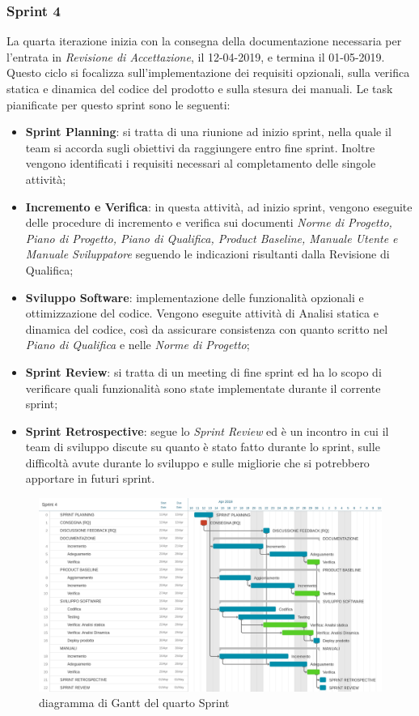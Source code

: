 \subsubsection{Sprint 4}
La quarta iterazione inizia con la consegna della documentazione necessaria per l'entrata in \emph{Revisione di Accettazione}, il 12-04-2019, e termina il 01-05-2019. Questo ciclo si focalizza sull'implementazione dei requisiti opzionali, sulla verifica statica e dinamica del codice del prodotto e sulla stesura dei manuali.
Le task pianificate per questo sprint sono le seguenti:
	\begin{itemize}
		\item \textbf{Sprint Planning}: si tratta di una riunione ad inizio sprint, nella quale il team si accorda sugli obiettivi da raggiungere entro fine sprint. Inoltre vengono identificati i requisiti necessari al completamento delle singole attività;
		\item \textbf{Incremento e Verifica}: in questa attività, ad inizio sprint, vengono eseguite delle procedure di incremento e verifica sui documenti \emph{Norme di Progetto, Piano di Progetto, Piano di Qualifica, Product Baseline, Manuale Utente e Manuale Sviluppatore} seguendo le indicazioni risultanti dalla Revisione di Qualifica;
		\item \textbf{Sviluppo Software}: implementazione delle funzionalità opzionali e ottimizzazione del codice. Vengono eseguite attività di Analisi statica e dinamica del codice, così da assicurare consistenza con quanto scritto nel \emph{Piano di Qualifica} e nelle \emph{Norme di Progetto};
		\item \textbf{Sprint Review}: si tratta di un meeting di fine sprint ed ha lo scopo di verificare quali funzionalità sono state implementate durante il corrente sprint;
		\item \textbf{Sprint Retrospective}: segue lo \emph{Sprint Review} ed è un incontro in cui il team di sviluppo discute su quanto è stato fatto durante lo sprint, sulle difficoltà avute durante lo sviluppo e sulle migliorie che si potrebbero apportare in futuri sprint.
	\end{itemize}
\begin{figure}[htbp]
	\centering
	\includegraphics[width=15cm,keepaspectratio]{../includes/pics/grafici/Sprint_4.jpeg}
	\caption{\label{fig:gantt-sprint4}diagramma di Gantt del quarto Sprint}
\end{figure}

